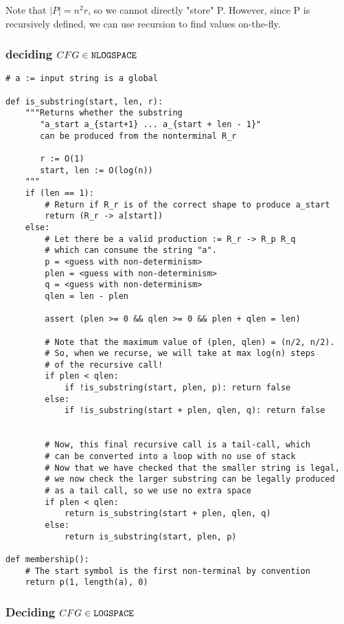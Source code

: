 \documentclass{article}
\begin{document}
Note that $|P| = n^2 r$, so we cannot directly "store" P. However,
since P is recursively defined, we can use recursion to find values
on-the-fly.


\subsubsection{deciding $CFG \in \texttt{NLOGSPACE}~$}

\begin{verbatim}
# a := input string is a global

def is_substring(start, len, r):
    """Returns whether the substring 
       "a_start a_{start+1} ... a_{start + len - 1}"
       can be produced from the nonterminal R_r

       r := O(1)
       start, len := O(log(n))
    """
    if (len == 1):
        # Return if R_r is of the correct shape to produce a_start
        return (R_r -> a[start])
    else:
        # Let there be a valid production := R_r -> R_p R_q
        # which can consume the string "a".
        p = <guess with non-determinism>
        plen = <guess with non-determinism>
        q = <guess with non-determinism>
        qlen = len - plen

        assert (plen >= 0 && qlen >= 0 && plen + qlen = len)

        # Note that the maximum value of (plen, qlen) = (n/2, n/2).
        # So, when we recurse, we will take at max log(n) steps
        # of the recursive call!
        if plen < qlen:
            if !is_substring(start, plen, p): return false
        else:
            if !is_substring(start + plen, qlen, q): return false


        # Now, this final recursive call is a tail-call, which
        # can be converted into a loop with no use of stack
        # Now that we have checked that the smaller string is legal,
        # we now check the larger substring can be legally produced
        # as a tail call, so we use no extra space
        if plen < qlen:
            return is_substring(start + plen, qlen, q)
        else:
            return is_substring(start, plen, p)

def membership():
    # The start symbol is the first non-terminal by convention
    return p(1, length(a), 0)
\end{verbatim}



\subsubsection{Deciding $CFG \in \texttt{LOGSPACE}~$}
\end{document}
